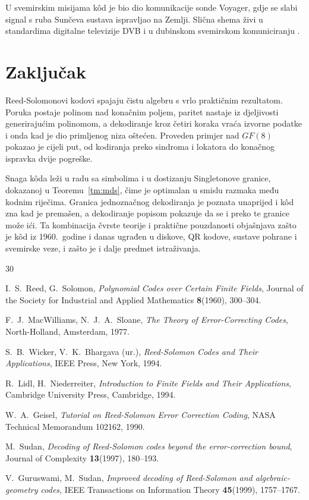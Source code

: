 \documentclass{mathos}
\begin{document}
U svemirskim misijama kôd je bio dio komunikacije sonde Voyager, gdje se slabi signal s ruba Sunčeva sustava ispravljao na Zemlji. Slična shema živi u standardima digitalne televizije DVB i u dubinskom svemirskom komuniciranju \cite{wicker}.


\chapter{Zaključak}\label{zakljucak}

\noindent
Reed-Solomonovi kodovi spajaju čistu algebru s vrlo praktičnim rezultatom. Poruka postaje polinom nad konačnim poljem, paritet nastaje iz djeljivosti generirajućim polinomom, a dekodiranje kroz četiri koraka vraća izvorne podatke i onda kad je dio primljenog niza oštećen. Proveden primjer nad $GF(8)$ pokazao je cijeli put, od kodiranja preko sindroma i lokatora do konačnog ispravka dvije pogreške.

Snaga kôda leži u radu sa simbolima i u dostizanju Singletonove granice, dokazanoj u Teoremu~\ref{tm:mds}, čime je optimalan u smislu razmaka među kodnim riječima. Granica jednoznačnog dekodiranja je poznata unaprijed i kôd zna kad je premašen, a dekodiranje popisom pokazuje da se i preko te granice može ići. Ta kombinacija čvrste teorije i praktične pouzdanosti objašnjava zašto je kôd iz 1960.\ godine i danas ugrađen u diskove, QR kodove, sustave pohrane i svemirske veze, i zašto je i dalje predmet istraživanja.


\begin{thebibliography}{30}

{\sc I.~S.~Reed, G.~Solomon}, {\em Polynomial Codes over Certain Finite Fields}, Journal of the Society for Industrial and Applied Mathematics {\bf 8}(1960), 300--304.

{\sc F.~J.~MacWilliams, N.~J.~A.~Sloane}, {\em The Theory of Error-Correcting Codes}, North-Holland, Amsterdam, 1977.

{\sc S.~B.~Wicker, V.~K.~Bhargava (ur.)}, {\em Reed-Solomon Codes and Their Applications}, IEEE Press, New York, 1994.

{\sc R.~Lidl, H.~Niederreiter}, {\em Introduction to Finite Fields and Their Applications}, Cambridge University Press, Cambridge, 1994.

{\sc W.~A.~Geisel}, {\em Tutorial on Reed-Solomon Error Correction Coding}, NASA Technical Memorandum 102162, 1990.

{\sc M.~Sudan}, {\em Decoding of Reed-Solomon codes beyond the error-correction bound}, Journal of Complexity {\bf 13}(1997), 180--193.

{\sc V.~Guruswami, M.~Sudan}, {\em Improved decoding of Reed-Solomon and algebraic-geometry codes}, IEEE Transactions on Information Theory {\bf 45}(1999), 1757--1767.
\end{thebibliography}
\end{document}
